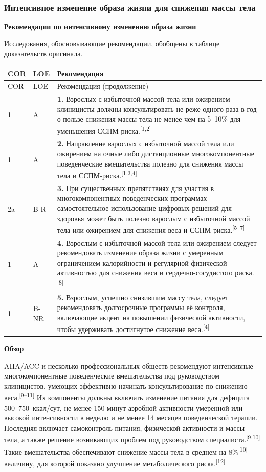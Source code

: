 \documentclass[11pt,a4paper]{article}
\newcommand{\src}[1]{\textsuperscript{[#1]}}
\newcommand{\heading}[1]{\par\medskip\textbf{#1}\par}
\begin{document}
\subsubsection{Интенсивное изменение образа жизни для снижения массы тела}
\heading{Рекомендации по интенсивному изменению образа жизни}
Исследования, обосновывающие рекомендации, обобщены в таблице доказательств оригинала.
{\small
\begin{longtable}{P{0.07\textwidth}P{0.11\textwidth}P{0.75\textwidth}}
\toprule COR & LOE & Рекомендация\\\midrule
\endfirsthead
\toprule COR & LOE & Рекомендация (продолжение)\\\midrule
{} & A & \textbf{1.} Взрослых с избыточной массой тела или ожирением клиницисты должны консультировать не реже одного раза в год о пользе снижения массы тела не менее чем на 5--10\% для уменьшения ССПМ-риска.\src{1,2}\\[5pt]
1 & A & \textbf{2.} Направление взрослых с избыточной массой тела или ожирением на очные либо дистанционные многокомпонентные поведенческие вмешательства полезно для снижения массы тела и ССПМ-риска.\src{1,3,4}\\[5pt]
2a & B-R & \textbf{3.} При существенных препятствиях для участия в многокомпонентных поведенческих программах самостоятельное использование цифровых решений для здоровья может быть полезно взрослым с избыточной массой тела или ожирением для снижения веса и ССПМ-риска.\src{5--7}\\[5pt]
1 & A & \textbf{4.} Взрослым с избыточной массой тела или ожирением следует рекомендовать изменение образа жизни с умеренным ограничением калорийности и регулярной физической активностью для снижения веса и сердечно-сосудистого риска.\src{8}\\[5pt]
1 & B-NR & \textbf{5.} Взрослым, успешно снизившим массу тела, следует рекомендовать долгосрочные программы её контроля, включающие акцент на повышении физической активности, чтобы удерживать достигнутое снижение веса.\src{4}\\
\bottomrule
\end{longtable}
}

\heading{Обзор}
AHA/ACC и несколько профессиональных обществ рекомендуют интенсивные многокомпонентные поведенческие вмешательства под руководством клиницистов, умеющих эффективно начинать консультирование по снижению веса.\src{9--11} Их компоненты должны включать изменение питания для дефицита 500--750~ккал/сут, не менее 150 минут аэробной активности умеренной или высокой интенсивности в неделю и не менее 14 месяцев поведенческой терапии. Последняя включает самоконтроль питания, физической активности и массы тела, а также решение возникающих проблем под руководством специалиста.\src{9,10} Такие вмешательства обеспечивают снижение массы тела в среднем на 8\%\src{10} --- величину, для которой показано улучшение метаболического риска.\src{12}
\end{document}
